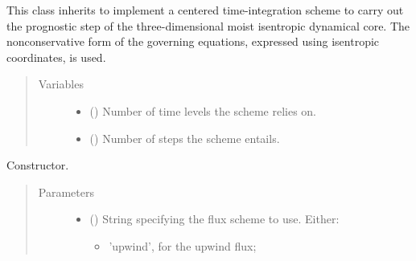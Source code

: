 \documentclass[letterpaper,10pt,english]{sphinxmanual}
\begin{document}
\begin{fulllineitems}
\label{\detokenize{api:dycore.prognostic_isentropic_nonconservative_centered.PrognosticIsentropicNonconservativeCentered}}
This class inherits {\hyperref[\detokenize{api:dycore.prognostic_isentropic_nonconservative.PrognosticIsentropicNonconservative}]{}}
to implement a centered time-integration scheme to carry out the prognostic step of the three-dimensional
moist isentropic dynamical core. The nonconservative form of the governing equations, expressed using isentropic
coordinates, is used.
\begin{quote}\begin{description}
\item[{Variables}] \leavevmode\begin{itemize}
\item {} 
{\hyperref[\detokenize{api:dycore.dycore.DynamicalCore.time_levels}]{}} () \textendash{} Number of time levels the scheme relies on.

\item {} 
 () \textendash{} Number of steps the scheme entails.

\end{itemize}

\end{description}\end{quote}

\begin{fulllineitems}
\label{\detokenize{api:dycore.prognostic_isentropic_nonconservative_centered.PrognosticIsentropicNonconservativeCentered.__init__}}
Constructor.
\begin{quote}\begin{description}
\item[{Parameters}] \leavevmode\begin{itemize}
\item {} 
 () \textendash{} 
String specifying the flux scheme to use. Either:
\begin{itemize}
\item {} 
’upwind’, for the upwind flux;


\end{itemize}
\end{itemize}
\end{description}
\end{quote}
\end{fulllineitems}
\end{fulllineitems}
\end{document}
